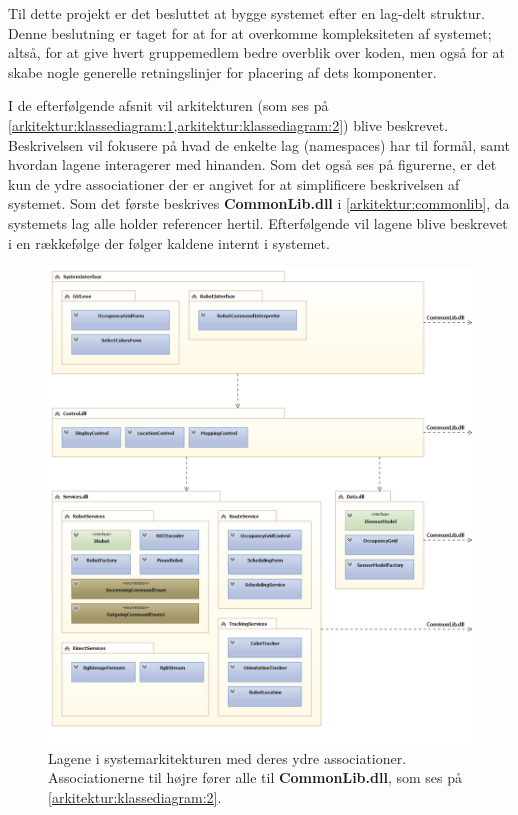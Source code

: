 \label{arkitektur}
Til dette projekt er det besluttet at bygge systemet efter en lag-delt struktur.
Denne beslutning er taget for at for at overkomme kompleksiteten af systemet; altså, for at give hvert gruppemedlem bedre overblik over koden, men også for at skabe nogle generelle retningslinjer for placering af dets komponenter.

I de efterfølgende afsnit vil arkitekturen (som ses på  \cref{arkitektur:klassediagram:1,arkitektur:klassediagram:2}) blive beskrevet.
Beskrivelsen vil fokusere på hvad de enkelte lag (namespaces) har til formål, samt hvordan lagene interagerer med hinanden.
Som det også ses på figurerne, er det kun de ydre associationer der er angivet for at simplificere beskrivelsen af systemet.
Som det første beskrives \textbf{CommonLib.dll} i \cref{arkitektur:commonlib}, da systemets lag alle holder referencer hertil.
Efterfølgende vil lagene blive beskrevet i en rækkefølge der følger kaldene internt i systemet.
\begin{figure}
\centering
\includegraphics[width=1\textwidth]{./graphics/systemarkitektur_1}
\caption{Lagene i systemarkitekturen med deres ydre associationer. Associationerne til højre fører alle til \textbf{CommonLib.dll}, som ses på \cref{arkitektur:klassediagram:2}.}
\label{arkitektur:klassediagram:1}
\end{figure}

